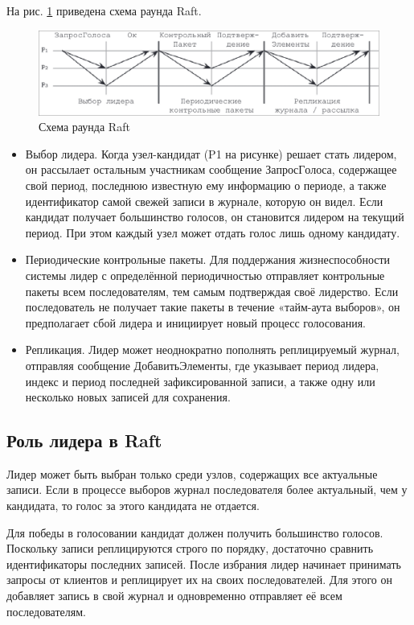 На рис. \ref{fig:raft} приведена схема раунда Raft.

\begin{figure}
  \centering
  \includegraphics[scale=0.4]{inc/raft.png}
  \caption{Схема раунда Raft}
  \label{fig:raft}
\end{figure}

\begin{itemize}
    \item Выбор лидера. Когда узел-кандидат (P1 на рисунке) решает стать лидером,
        он рассылает остальным участникам сообщение $ЗапросГолоса$, содержащее свой
        период, последнюю известную ему информацию о периоде, а также идентификатор
        самой свежей записи в журнале, которую он видел. Если кандидат получает
        большинство голосов, он становится лидером на текущий период. При этом
        каждый узел может отдать голос лишь одному кандидату.
    \item Периодические контрольные пакеты. Для поддержания жизнеспособности
        системы лидер с определённой периодичностью отправляет контрольные
        пакеты всем последователям, тем самым подтверждая своё лидерство. Если
        последователь не получает такие пакеты в течение «тайм-аута выборов»,
        он предполагает сбой лидера и инициирует новый процесс голосования.
    \item Репликация. Лидер может неоднократно пополнять реплицируемый журнал,
        отправляя сообщение $ДобавитьЭлементы$, где указывает период лидера,
        индекс и период последней зафиксированной записи, а также одну или
        несколько новых записей для сохранения.
\end{itemize}

\subsection{Роль лидера в Raft}

Лидер может быть выбран только среди узлов, содержащих все актуальные записи.
Если в процессе выборов журнал последователя более актуальный, чем у кандидата,
то голос за этого кандидата не отдается.

Для победы в голосовании кандидат должен получить большинство голосов. Поскольку
записи реплицируются строго по порядку, достаточно сравнить идентификаторы последних
записей. После избрания лидер начинает принимать запросы от клиентов и реплицирует
их на своих последователей. Для этого он добавляет запись в свой журнал и
одновременно отправляет её всем последователям.

